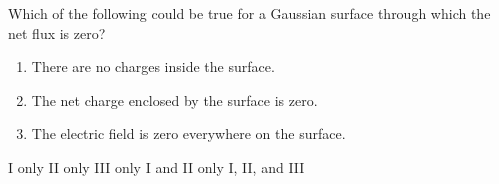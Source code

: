 
\begin{questions}
\setcounter{question}{3}

\question
Which of the following could be true for a Gaussian surface through which the net flux is zero?

\begin{enumerate}
    \item There are no charges inside the surface.
    \item The net charge enclosed by the surface is zero.
    \item The electric field is zero everywhere on the surface.
\end{enumerate}

\begin{oneparchoices}
    \choice I only
    \choice II only
    \choice III only
    \choice I and II only
    \choice I, II, and III
\end{oneparchoices}

\end{questions}
